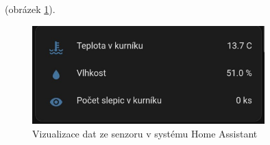 (obrázek \ref{fig:homeasistant_temperature}).

\begin{figure}[H]
    \centering
    \includegraphics[width=0.8\textwidth]{img/homeasistant_temperature.png}
    \caption{Vizualizace dat ze senzoru v systému Home Assistant}
    \label{fig:homeasistant_temperature}
\end{figure}


%

%
